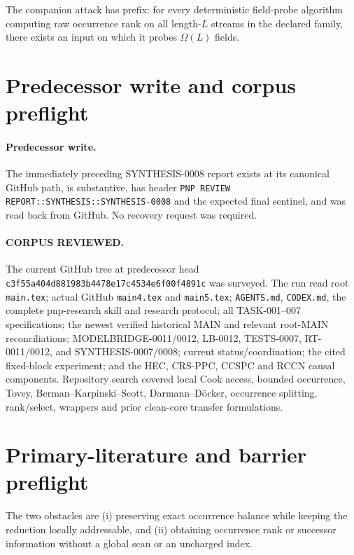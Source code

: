 \documentclass[11pt]{article}
\begin{document}
The companion attack has prefix: for every deterministic field-probe
algorithm computing raw occurrence rank on all length-$L$ streams in the
declared family, there exists an input on which it probes
$\Omega(L)$ fields.

\section{Predecessor write and corpus preflight}

\paragraph{Predecessor write.}
The immediately preceding SYNTHESIS-0008 report exists at its canonical
GitHub path, is substantive, has header
\texttt{PNP REVIEW REPORT::SYNTHESIS::SYNTHESIS-0008} and the expected final
sentinel, and was read back from GitHub.  No recovery request was required.

\paragraph{CORPUS REVIEWED.}
The current GitHub tree at predecessor head
\texttt{c3f55a404d881983b4478e17c4534e6f00f4891c} was surveyed.  The run
read root \texttt{main.tex}; actual GitHub \texttt{main4.tex} and
\texttt{main5.tex}; \texttt{AGENTS.md}, \texttt{CODEX.md}, the complete
pnp-research skill and research protocol; all TASK-001--007 specifications;
the newest verified historical MAIN and relevant root-MAIN reconciliations;
MODELBRIDGE-0011/0012, LB-0012, TESTS-0007, RT-0011/0012, and
SYNTHESIS-0007/0008; current status/coordination; the cited fixed-block
experiment; and the HEC, CRS-PPC, CCSPC and RCCN causal components.
Repository search covered local Cook access, bounded occurrence, Tovey,
Berman--Karpinski--Scott, Darmann--D\"ocker, occurrence splitting, rank/select,
wrappers and prior clean-core transfer formulations.

\section{Primary-literature and barrier preflight}

The two obstacles are (i) preserving exact occurrence balance while keeping
the reduction locally addressable, and (ii) obtaining occurrence rank or
successor information without a global scan or an uncharged index.
\end{document}
